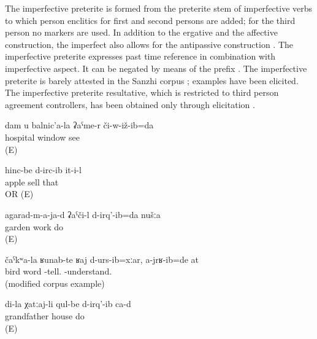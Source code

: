 The imperfective preterite is formed from the preterite stem of imperfective verbs to which person enclitics for first and second persons are added; for the third person no markers are used. In addition to the ergative and the affective construction, the imperfect also allows for the antipassive construction . The imperfective preterite expresses past time reference in combination with imperfective aspect. It can be negated by means of the prefix . The imperfective preterite is barely attested in the Sanzhi corpus ; examples  have been elicited. The imperfective preterite resultative, which is restricted to third person agreement controllers, has been obtained only through elicitation .
%
\begin{exe}
	\ex	\label{ex:I saw you (repeatedly) from the window of the hospital}
	\gll	dam	u	balnic’a-la	ʡaˁme-r	či-w-iž-ib=da\\
				hospital	window	see\\
	\glt	{} (E)

	\ex	\label{ex:S/he sold apples analytic}
	\gll	hinc-be	d-irc-ib	it-i-l\\
		apple	sell	that\\
	\glt	{} OR  (E)

	\ex	\label{ex:We (repeatedly) worked in the garden}
	\gll	agarad-m-a-ja-d	ʡaˁči-l	d-irq'-ib=da	nušːa\\
		garden	work	do	\\
	\glt	{} (E)

	\ex	\label{ex:Although I said words like a bird, you did not understand them}
	\gll	čaˁkʷa-la	ʁunab-te	ʁaj	d-urs-ib=xːar,	a-jrʁ-ib=de	at\\
		bird	 	word	-tell.	-understand.	\\
	\glt	{} (modified corpus example)
	
	\ex	\label{ex:My grandfather (apparently) built houses analytic}
	\gll	di-la	χatːaj-li	qul-be	d-irq'-ib	ca-d\\
			grandfather	house	do	\\
	\glt	{} (E)

\end{exe}

